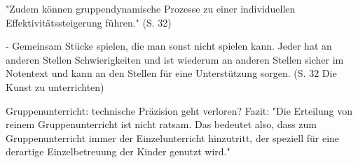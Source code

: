 "Zudem können gruppendynamische Prozesse zu einer individuellen
Effektivitätssteigerung führen." (S. 32)

- Gemeinsam Stücke spielen, die man sonst nicht spielen kann. Jeder hat an
anderen Stellen Schwierigkeiten und ist wiederum an anderen Stellen sicher im
Notentext und kann an den Stellen für eine Unterstützung sorgen. (S. 32 Die
Kunst zu unterrichten)

Gruppenunterricht: technische Präzision geht verloren? 
Fazit: "Die  Erteilung von reinem Gruppenunterricht ist nicht ratsam. Das
bedeutet also, dass zum Gruppenunterricht immer der Einzelunterricht hinzutritt,
der speziell für eine derartige Einzelbetreuung der Kinder genutzt wird."
\autocite[57]{ernst:die_zukunftsfaehige_musikschule}
